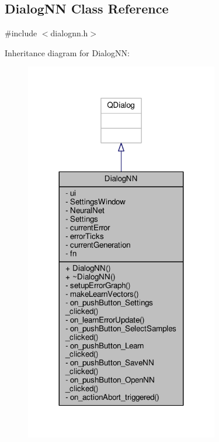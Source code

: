 \hypertarget{class_dialog_n_n}{}\subsection{Dialog\+N\+N Class Reference}
\label{class_dialog_n_n}


{\ttfamily \#include $<$dialognn.\+h$>$}



Inheritance diagram for Dialog\+N\+N\+:
\nopagebreak
\begin{figure}[H]
\begin{center}
\leavevmode
\includegraphics[width=239pt]{class_dialog_n_n__inherit__graph}
\end{center}
\end{figure}



